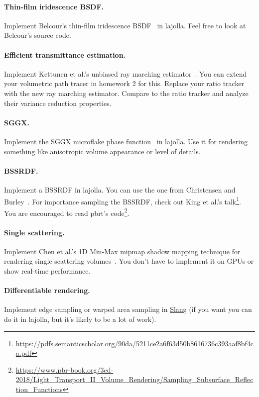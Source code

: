 \paragraph{Thin-film iridescence BSDF.}
Implement Belcour's thin-film iridescence BSDF~\cite{Belcour:2017:PEM} in lajolla.
Feel free to look at Belcour's source code.

\paragraph{Efficient transmittance estimation.}
Implement Kettunen et al.'s unbiased ray marching estimator~\cite{Kettunen:2021:URT}.
You can extend your volumetric path tracer in homework 2 for this.
Replace your ratio tracker with the new ray marching estimator.
Compare to the ratio tracker and analyze their variance reduction properties.

\paragraph{SGGX.}
Implement the SGGX microflake phase function~\cite{Heitz:2015:SMD} in lajolla. Use it for rendering something like anisotropic volume appearance or level of details.

\paragraph{BSSRDF.}
Implement a BSSRDF in lajolla.
You can use the one from Christensen and Burley~\cite{Christensen:2015:ARP}.
For importance sampling the BSSRDF, check out King et al.'s talk\footnote{\url{https://pdfs.semanticscholar.org/90da/5211ce2a6f63d50b8616736c393aaf8bf4ca.pdf}}.
You are encouraged to read pbrt's code\footnote{\url{https://www.pbr-book.org/3ed-2018/Light_Transport_II_Volume_Rendering/Sampling_Subsurface_Reflection_Functions}}.

\paragraph{Single scattering.}
Implement Chen et al.'s 1D Min-Max mipmap shadow mapping technique for rendering single scattering volumes~\cite{Chen:2011:RVS}.
You don't have to implement it on GPUs or show real-time performance.

\paragraph{Differentiable rendering.}
Implement edge sampling or warped area sampling in \href{https://developer.nvidia.com/blog/differentiable-slang-example-applications/}{Slang} (if you want you can do it in lajolla, but it's likely to be a lot of work). 

